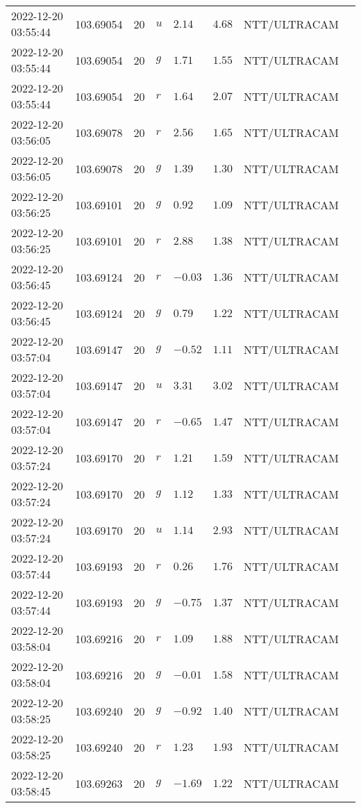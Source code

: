 \documentclass{nature_plusfigure}
\begin{document}
\begin{supplement}
\begin{center}
\begin{longtable}{llllllll}
2022-12-20 03:55:44 & 103.69054 & 20 & $u$ & $2.14$ & $4.68$ & NTT/ULTRACAM &  \\ 
2022-12-20 03:55:44 & 103.69054 & 20 & $g$ & $1.71$ & $1.55$ & NTT/ULTRACAM &  \\ 
2022-12-20 03:55:44 & 103.69054 & 20 & $r$ & $1.64$ & $2.07$ & NTT/ULTRACAM &  \\ 
2022-12-20 03:56:05 & 103.69078 & 20 & $r$ & $2.56$ & $1.65$ & NTT/ULTRACAM &  \\ 
2022-12-20 03:56:05 & 103.69078 & 20 & $g$ & $1.39$ & $1.30$ & NTT/ULTRACAM &  \\ 
2022-12-20 03:56:25 & 103.69101 & 20 & $g$ & $0.92$ & $1.09$ & NTT/ULTRACAM &  \\ 
2022-12-20 03:56:25 & 103.69101 & 20 & $r$ & $2.88$ & $1.38$ & NTT/ULTRACAM &  \\ 
2022-12-20 03:56:45 & 103.69124 & 20 & $r$ & $-0.03$ & $1.36$ & NTT/ULTRACAM &  \\ 
2022-12-20 03:56:45 & 103.69124 & 20 & $g$ & $0.79$ & $1.22$ & NTT/ULTRACAM &  \\ 
2022-12-20 03:57:04 & 103.69147 & 20 & $g$ & $-0.52$ & $1.11$ & NTT/ULTRACAM &  \\ 
2022-12-20 03:57:04 & 103.69147 & 20 & $u$ & $3.31$ & $3.02$ & NTT/ULTRACAM &  \\ 
2022-12-20 03:57:04 & 103.69147 & 20 & $r$ & $-0.65$ & $1.47$ & NTT/ULTRACAM &  \\ 
2022-12-20 03:57:24 & 103.69170 & 20 & $r$ & $1.21$ & $1.59$ & NTT/ULTRACAM &  \\ 
2022-12-20 03:57:24 & 103.69170 & 20 & $g$ & $1.12$ & $1.33$ & NTT/ULTRACAM &  \\ 
2022-12-20 03:57:24 & 103.69170 & 20 & $u$ & $1.14$ & $2.93$ & NTT/ULTRACAM &  \\ 
2022-12-20 03:57:44 & 103.69193 & 20 & $r$ & $0.26$ & $1.76$ & NTT/ULTRACAM &  \\ 
2022-12-20 03:57:44 & 103.69193 & 20 & $g$ & $-0.75$ & $1.37$ & NTT/ULTRACAM &  \\ 
2022-12-20 03:58:04 & 103.69216 & 20 & $r$ & $1.09$ & $1.88$ & NTT/ULTRACAM &  \\ 
2022-12-20 03:58:04 & 103.69216 & 20 & $g$ & $-0.01$ & $1.58$ & NTT/ULTRACAM &  \\ 
2022-12-20 03:58:25 & 103.69240 & 20 & $g$ & $-0.92$ & $1.40$ & NTT/ULTRACAM &  \\ 
2022-12-20 03:58:25 & 103.69240 & 20 & $r$ & $1.23$ & $1.93$ & NTT/ULTRACAM &  \\ 
2022-12-20 03:58:45 & 103.69263 & 20 & $g$ & $-1.69$ & $1.22$ & NTT/ULTRACAM &  \\ 

\end{longtable}
\end{center}
\end{supplement}
\end{document}
